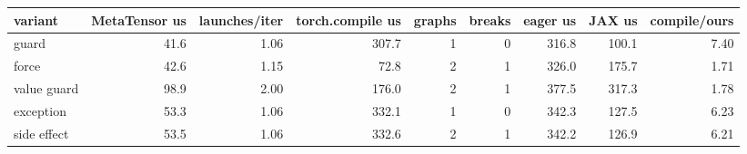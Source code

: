 \begin{tabular}{lrrrrrrrr}
\toprule
variant & MetaTensor us & launches/iter & torch.compile us & graphs & breaks & eager us & JAX us & compile/ours \\
\midrule
guard & 41.6 & 1.06 & 307.7 & 1 & 0 & 316.8 & 100.1 & 7.40 \\
force & 42.6 & 1.15 & 72.8 & 2 & 1 & 326.0 & 175.7 & 1.71 \\
value guard & 98.9 & 2.00 & 176.0 & 2 & 1 & 377.5 & 317.3 & 1.78 \\
exception & 53.3 & 1.06 & 332.1 & 1 & 0 & 342.3 & 127.5 & 6.23 \\
side effect & 53.5 & 1.06 & 332.6 & 2 & 1 & 342.2 & 126.9 & 6.21 \\
\bottomrule
\end{tabular}
